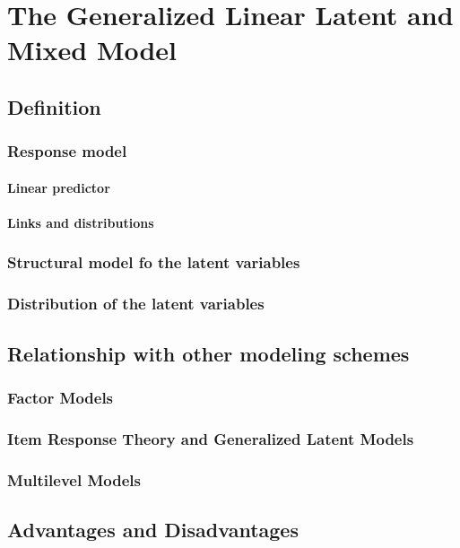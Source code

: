 \chapter{The Generalized Linear Latent and Mixed Model} \label{chap:framework}


\section{Definition}

\subsection{Response model}

\subsubsection{Linear predictor}

\subsubsection{Links and distributions}

\subsection{Structural model fo the latent variables}

\subsection{Distribution of the latent variables}



\section{Relationship with other modeling schemes}

\subsection{Factor Models}

\subsection{Item Response Theory and Generalized Latent Models}

\subsection{Multilevel Models}



\section{Advantages and Disadvantages}